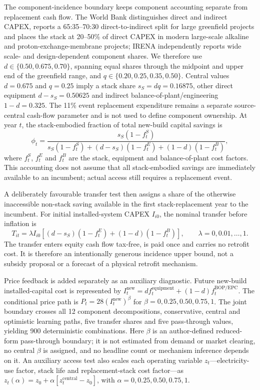 \documentclass[pdflatex,sn-nature]{sn-jnl}
\begin{document}
The component-incidence boundary keeps component accounting separate from replacement cash flow. The World Bank distinguishes direct and indirect CAPEX, reports a 65:35--70:30 direct-to-indirect split for large greenfield projects and places the stack at 20--50\% of direct CAPEX in modern large-scale alkaline and proton-exchange-membrane projects\cite{worldbank2026}; IRENA independently reports wide scale- and design-dependent component shares\cite{irena2020}. We therefore use $d\in\{0.50,0.675,0.70\}$, spanning equal shares through the midpoint and upper end of the greenfield range, and $q\in\{0.20,0.25,0.35,0.50\}$. Central values $d=0.675$ and $q=0.25$ imply a stack share $s_S=dq=0.16875$, other direct equipment $d-s_S=0.50625$ and indirect balance-of-plant/engineering $1-d=0.325$. The 11\% event replacement expenditure remains a separate source-central cash-flow parameter and is not used to define component ownership. At year $t$, the stack-embodied fraction of total new-build capital savings is
\begin{equation}
\phi_t=\frac{s_S(1-f^S_t)}{s_S(1-f^S_t)+(d-s_S)(1-f^E_t)+(1-d)(1-f^B_t)},
\label{eq:si_incidence}
\end{equation}
where $f^S_t$, $f^E_t$ and $f^B_t$ are the stack, equipment and balance-of-plant cost factors. This accounting does not assume that all stack-embodied savings are immediately available to an incumbent; actual access still requires a replacement event.

A deliberately favourable transfer test then assigns a share of the otherwise inaccessible non-stack saving available in the first stack-replacement year to the incumbent. For initial installed-system CAPEX $I_{i0}$, the nominal transfer before inflation is
\begin{equation}
T_{it}=\lambda I_{i0}\left[(d-s_S)(1-f^E_t)+(1-d)(1-f^B_t)\right],
\qquad \lambda=0,0.01,\ldots,1.
\label{eq:si_transfer}
\end{equation}
The transfer enters equity cash flow tax-free, is paid once and carries no retrofit cost. It is therefore an intentionally generous incidence upper bound, not a subsidy proposal or a forecast of a physical retrofit mechanism.

Price feedback is added separately as an auxiliary diagnostic. Future new-build installed-capital cost is represented by $I_t^{\mathrm{new}}=d f_t^{\mathrm{equipment}}+(1-d)f_t^{\mathrm{BOP/EPC}}$. The conditional price path is $P_t=28(I_t^{\mathrm{new}})^\beta$ for $\beta=0,0.25,0.50,0.75,1$. The joint boundary crosses all 12 component decompositions, conservative, central and optimistic learning paths, five transfer shares and five pass-through values, yielding 900 deterministic combinations. Here $\beta$ is an author-defined reduced-form pass-through boundary; it is not estimated from demand or market clearing, no central $\beta$ is assigned, and no headline count or mechanism inference depends on it. An auxiliary access test also scales each operating variable $z_t$---electricity-use factor, stack life and replacement-stack cost factor---as $z_t(\alpha)=z_0+\alpha[z_t^{\mathrm{central}}-z_0]$, with $\alpha=0,0.25,0.50,0.75,1$.
\end{document}
